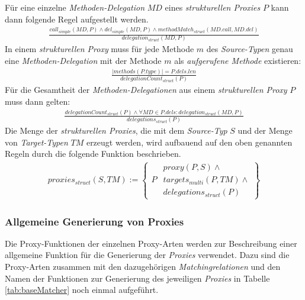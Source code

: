 \noindent
Für eine einzelne \emph{Methoden-Delegation} $\mathit{MD}$ eines \emph{strukturellen Proxies} $P$ kann dann folgende Regel aufgestellt werden.
\begin{gather*}
\frac{\mathit{call_{simple}(MD, P)} \wedge \mathit{del_{simple}(MD, P)} \wedge \mathit{methodMatch_{struct}(MD.call, MD.del)}}
{\mathit{delegation_{struct}(MD, P)}}
\end{gather*}
\noindent
In einem \emph{strukturellen Proxy} muss für jede Methode $m$ des \emph{Source-Typen} genau eine \emph{Methoden-Delegation} mit der Methode $m$ als \emph{aufgerufene Methode} existieren:
\begin{gather*}
\frac{|\mathit{methods(P.type)}| = P.dels.len}{delegationCount_{struct}(P)}
\end{gather*}
\noindent
Für die Gesamtheit der \emph{Methoden-Delegationen} aus einem \emph{strukturellen Proxy} $P$ muss dann gelten:
\begin{gather*}
\frac{\mathit{delegationCount_{struct}(P)} \wedge \forall \mathit{MD} \in P.dels: \mathit{delegation_{struct}(MD,P)}}
{\mathit{delegations_{struct}(P)}}
\end{gather*}
\noindent
Die Menge der \emph{strukturellen Proxies}, die mit dem \emph{Source-Typ} $S$ und der Menge von \emph{Target-Typen} $\mathit{TM}$ erzeugt werden, wird aufbauend auf den oben genannten Regeln durch die folgende Funktion beschrieben.
\begin{gather*}
\mathit{proxies_{struct}(S,\mathit{TM})} := 
\left\{\begin{array}{l|l}
		& \mathit{proxy(P,S)}\wedge \mathit{ }\\
	P	& \mathit{targets_{multi}(P,\mathit{TM})} \wedge \mathit{ }\\
		& \mathit{delegations_{struct}(P)}  
		 \end{array}
\right\}
\end{gather*}

\subsubsection{Allgemeine Generierung von Proxies}
Die Proxy-Funktionen der einzelnen Proxy-Arten werden zur Beschreibung einer allgemeine Funktion für die Generierung der \emph{Proxies} verwendet. Dazu sind die Proxy-Arten zusammen mit den dazugehörigen \emph{Matchingrelationen} und den Namen der Funktionen zur Generierung des jeweiligen \emph{Proxies} in Tabelle \ref{tab:baseMatcher} noch einmal aufgeführt.

